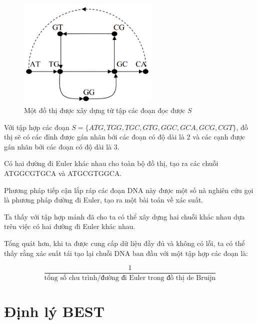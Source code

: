 \documentclass[10pt]{beamer}
\theoremstyle{remark}
\numberwithin{algocf}{section}
\numberwithin{equation}{section}
\numberwithin{dl}{section}
\numberwithin{figure}{section}
\begin{document}
\begin{frame}
    \begin{figure}[h!]
        \centering
        \includegraphics[width=0.6\textwidth]{3.png}
        \caption{Một đồ thị được xây dựng từ tập các đoạn đọc được $S$}
        \label{fig:3}
    \end{figure}

    Với tập hợp các đoạn $S = \lbrace ATG, TGG, TGC, GTG, GGC, GCA, GCG, CGT \rbrace$,
    đồ thị sẽ có các đỉnh được gán nhãn bởi các đoạn có độ dài là 2 và các cạnh được gán nhãn bởi các đoạn có độ dài là 3.

\end{frame}

\begin{frame}
    Có hai đường đi Euler khác nhau cho toàn bộ đồ thị, tạo ra các chuỗi ATGGCGTGCA và ATGCGTGGCA.

    Phương pháp tiếp cận lắp ráp các đoạn DNA này được một số nà nghiên cứu gọi là phương pháp đường đi Euler, tạo ra một bài toán về xác suất.

    Ta thấy với tập hợp mảnh đã cho ta có thể xây dựng hai chuỗi khác nhau dựa trên việc có hai đường đi Euler khác nhau.

    Tổng quát hơn, khi ta được cung cấp dữ liệu đầy đủ và không có lỗi, ta có thể thấy rằng xác suất tái tạo lại chuỗi DNA ban đầu với một tập hợp các đoạn là:

    \begin{equation}
        \dfrac{1}{\text{tổng số chu trình/đường đi Euler trong đồ thị de Bruijn}}
    \end{equation}
\end{frame}

\section{Định lý BEST}
\end{document}
